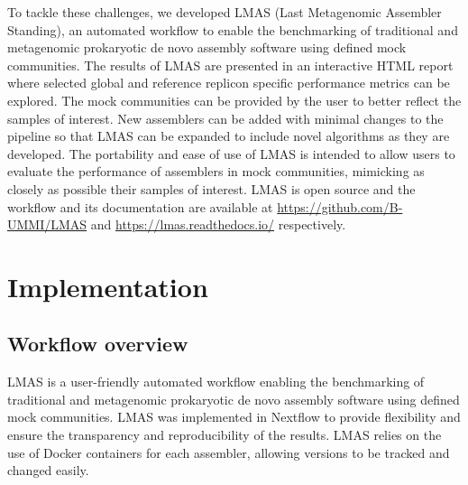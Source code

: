To tackle these challenges, we developed LMAS (Last Metagenomic Assembler Standing), an automated workflow to enable the benchmarking of traditional and metagenomic prokaryotic de novo assembly software using defined mock communities. The results of LMAS are presented in an interactive HTML report where selected global and reference replicon specific performance metrics can be explored. The mock communities can be provided by the user to better reflect the samples of interest. New assemblers can be added with minimal changes to the pipeline so that LMAS can be expanded to include novel algorithms as they are developed. The portability and ease of use of LMAS is intended to allow users to evaluate the performance of assemblers in mock communities, mimicking as closely as possible their samples of interest. LMAS is open source and the workflow and its documentation are available at \url{https://github.com/B-UMMI/LMAS} and \url{https://lmas.readthedocs.io/} respectively. 

\section{Implementation}

\subsection{Workflow overview}

LMAS is a user-friendly automated workflow enabling the benchmarking of traditional and metagenomic prokaryotic de novo assembly software using defined mock communities. LMAS was implemented in Nextflow \cite{di_tommaso_nextflow_2017} to provide flexibility and ensure the transparency and reproducibility of the results. LMAS relies on the use of Docker \cite{merkel_docker_2014} containers for each assembler, allowing versions to be tracked and changed easily.

